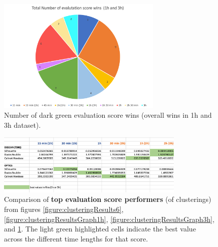 \begin{figure}
  \centering
  \includegraphics[width=0.7\textwidth]{./images/clusteringResults/clusteringResultsGraphTotal.png}
  \caption{Number of dark green evaluation score wins (overall wins in 1h and 3h dataset).}
  \label{figure:clusteringResultsGraphTotal}
\end{figure}

\begin{figure}
  \centering
  \includegraphics[width=0.8\textwidth]{./images/clusteringResults/clusteringResults8.png}
  \caption{Comparison of \textbf{top evaluation score performers} (of clusterings) from figures \ref{figure:clusteringResults6}, \ref{figure:clusteringResultsGraph1h}, \ref{figure:clusteringResultsGraph3h}, and \ref{figure:clusteringResultsGraphTotal}. The light green highlighted cells indicate the best value across the different time lengths for that score.}
  \label{figure:clusteringResults8}
\end{figure}

\clearpage
